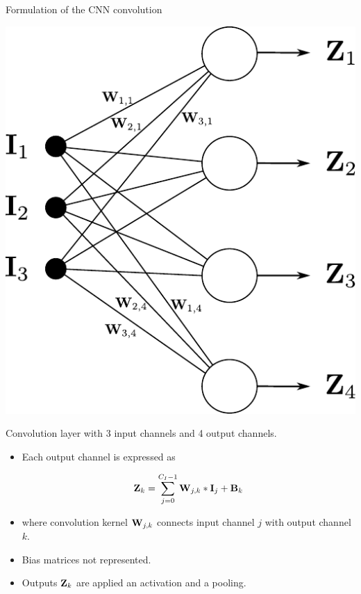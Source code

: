\documentclass{beamer}
\begin{document}
\begin{frame}{Formulation of the CNN convolution}
\begin{multicols}{2}
\includegraphics[scale=0.5]{Module 4 (CNN)/pics/Conv_rep.pdf}

Convolution layer  with 3 input channels and 4 output channels. 

\columnbreak 

\begin{itemize}
    \item Each output channel is expressed as


 \begin{equation}\nonumber
    {\bf Z}_k = \sum_{j=0}^{C_I-1} {\bf W}_{j,k} * {\bf I}_j + {\bf B}_k 
\end{equation}
\item where convolution kernel ${\bf W}_{j,k}$ connects input channel $j$ with output channel $k$. 
\item Bias matrices not represented. \item Outputs ${\bf Z}_k$ are applied an activation and a pooling.  
\end{itemize}

\end{multicols}
\end{frame}
\end{document}
